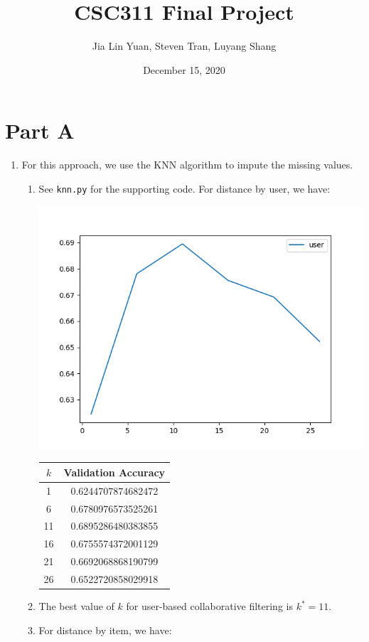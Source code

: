 \documentclass{article}
\title{CSC311 Final Project}
\author{Jia Lin Yuan, Steven Tran, Luyang Shang}
\date{December 15, 2020}
\begin{document}
\maketitle
\section{Part A}
\begin{enumerate}[label=\arabic*.]
    \item For this approach, we use the KNN algorithm to impute the missing values.
        \begin{enumerate}[label=(\alph*)]
            \item See \texttt{knn.py} for the supporting code. For distance by user, we have:

                \noindent
                \begin{minipage}{0.5\linewidth}
                    \centering
                    \includegraphics[width=\linewidth]{../starter_code/figs/knn_user.png}
                \end{minipage}\hfill
                \begin{minipage}{0.5\linewidth}
                    \center
                    \begin{tabular}{c|c}
                        $k$ & Validation Accuracy \\\hline
                        1 & 0.6244707874682472\\
                        6 & 0.6780976573525261\\
                        11 & 0.6895286480383855\\
                        16 & 0.6755574372001129\\
                        21 & 0.6692068868190799\\
                        26 & 0.6522720858029918
                    \end{tabular}
                \end{minipage}
            \item The best value of $k$ for user-based collaborative filtering is $k^*=11$.
            \item For distance by item, we have:


\end{enumerate}
\end{enumerate}
\end{document}
